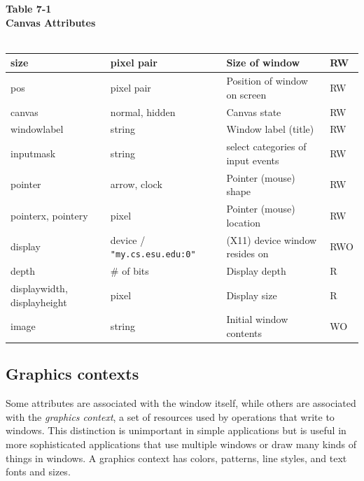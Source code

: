 \begin{center}
{\sffamily\bfseries Table 7-1} \\
{\sffamily\bfseries Canvas Attributes} \\
\ \\ 
  \begin{supertabular}{|m{1.03in}|m{1.9in}|m{2.24in}|m{0.44835988in}|}
    size & pixel pair & Size of window & RW \\\hline
    pos & pixel pair & Position of window on screen & RW \\\hline
    canvas & normal, hidden & Canvas state & RW\\\hline
    windowlabel & string & Window label (title) & RW \\\hline
    inputmask & string & select categories of input events & RW \\\hline
    pointer & arrow, clock & Pointer (mouse) shape  & RW \\\hline
    pointerx, pointery & pixel & Pointer (mouse) location & RW \\\hline
    display & device / \texttt{"my.cs.esu.edu:0"} & (X11) device window resides on & RWO \\\hline
    depth & \# of bits & Display depth & R \\\hline
    displaywidth, displayheight & pixel & Display size & R \\\hline
    image & string & Initial window contents & WO \\\hline
  \end{supertabular}
\end{center}

\subsection{Graphics contexts}

Some attributes are associated with the window itself, while others
are associated with the \textit{graphics context}, a set of resources
used by operations that write to windows. This distinction is
unimportant in simple applications but is useful in more sophisticated
applications that use multiple windows or draw many kinds of things in
windows. A graphics context has colors, patterns, line styles, and
text fonts and sizes.

